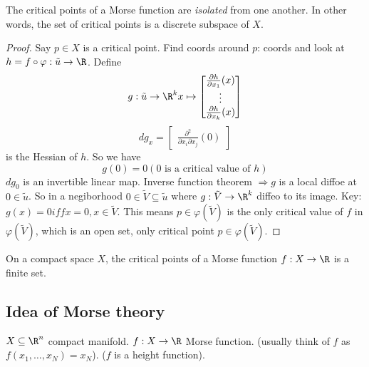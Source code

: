 \begin{proposition}
  The critical points of a Morse function are \emph{isolated} from one another. In other words, the set of critical points is a discrete subspace of $X$.
\end{proposition}
\begin{proof}
  Say $p \in X$ is a critical point. Find coords around $p$:
    \newline coords
    \newline and look at $h= f\circ \varphi : \tilde{u} \to \R$. Define
      $$g: \tilde{u} \to \R^k
        x \mapsto
        \begin{bmatrix}
          \frac{\partial h}{\partial x_1} (x) \\
          \vdots \\
          \frac{\partial h}{\partial x_k}(x)
        \end{bmatrix}
      $$
      $$dg_x =
      \begin{bmatrix}
          \frac{\partial^2}{\partial x_i \partial x_j}(0)
      \end{bmatrix}
      $$
      is the Hessian of $h$. So we have
        $$g(0)=0 ( 0 \text{ is a critical value of } h)$$
        $dg_0$ is an invertible linear map. Inverse function theorem $\Rightarrow g$ is a local diffoe at $0 \in \tilde{u}$. So in a negiborhood $0 \in \tilde{V}\subseteq \tilde{u}$ where $g: \tilde{V}\to \R^k$ diffeo to its image.
    \newline Key: $g(x)=0 iff x=0, x\in \tilde{V}$. This means $p\in \varphi (\tilde{V})$ is the only critical value of $f$ in $\varphi (\tilde{V})$, which is an open set, only critical point $p\in \varphi (\tilde{V})$.
\end{proof}

\begin{proposition}
  On a compact space $X$, the critical points of a Morse function $f: X \to \R$ is a finite set.
\end{proposition}

\subsection*{Idea of Morse theory}
$ X \subseteq \R^n $ compact manifold. $f: X \to \R$ Morse function. (usually think of $f$ as $f(x_1,\dots , x_N)=x_N$). ($f$ is a height function).

